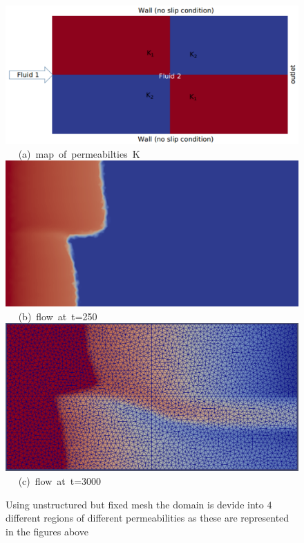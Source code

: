 \begin{figure}[ht] 
\vbox{
\hbox{\hspace{0.5cm}
\includegraphics[width=.85\textwidth]{./Pics1/2b2_wi_fine/2b2_whole_in_fine_perm_1.pdf} 
}
\vspace{0.0cm}
\hbox{\hspace{5.0cm} (a) map of permeabilties K  
}
\vspace{0.25cm}
\hbox{\hspace{1.5cm}
\includegraphics[width=.75\textwidth]{./Pics1/2b2_wi_fine/2b2_whole_in_fine_250_2.pdf}
}
\vspace{0.0cm}
\hbox{\hspace{5.0cm} (b) flow at t=250  
}
\vspace{0.25cm}
\hbox{\hspace{1.5cm}
\includegraphics[width=.75\textwidth]{./Pics1/2b2_wi_fine/2b2_whole_in_fine_3000_1.pdf}
}
\vspace{0.0cm}
\hbox{\hspace{5.0cm} (c) flow at t=3000  
}
}     
\caption{Using unstructured but fixed mesh the domain is devide into $4$ different regions of different permeabilities as these are represented in the figures above}
\label{fem_cv_represent_a}
\end{figure}
\clearpage


